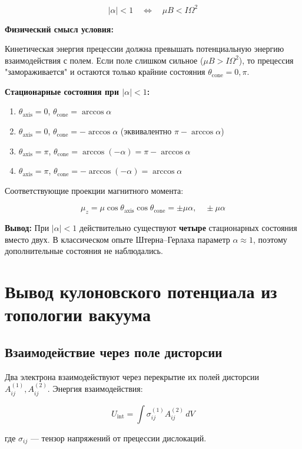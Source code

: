 \documentclass[12pt]{article}
\begin{document}
\[
|\alpha| < 1 \quad \Leftrightarrow \quad \mu B < I \Omega^2
\]

\textbf{Физический смысл условия:}

Кинетическая энергия прецессии должна превышать потенциальную энергию взаимодействия с полем. Если поле слишком сильное ($\mu B > I \Omega^2$), то прецессия "замораживается" и остаются только крайние состояния $\theta_{\text{cone}} = 0, \pi$.

\textbf{Стационарные состояния при $|\alpha| < 1$:}

\begin{enumerate}
\item $\theta_{\text{axis}} = 0$, $\theta_{\text{cone}} = \arccos\alpha$
\item $\theta_{\text{axis}} = 0$, $\theta_{\text{cone}} = -\arccos\alpha$ (эквивалентно $\pi - \arccos\alpha$)
\item $\theta_{\text{axis}} = \pi$, $\theta_{\text{cone}} = \arccos(-\alpha) = \pi - \arccos\alpha$
\item $\theta_{\text{axis}} = \pi$, $\theta_{\text{cone}} = -\arccos(-\alpha) = \arccos\alpha$
\end{enumerate}

Соответствующие проекции магнитного момента:

\[
\mu_z = \mu \cos\theta_{\text{axis}} \cos\theta_{\text{cone}} = \pm \mu \alpha, \quad \pm \mu \alpha
\]

\textbf{Вывод:} При $|\alpha| < 1$ действительно существуют \textbf{четыре} стационарных состояния вместо двух. В классическом опыте Штерна–Герлаха параметр $\alpha \approx 1$, поэтому дополнительные состояния не наблюдались.

\section{Вывод кулоновского потенциала из топологии вакуума}

\subsection{Взаимодействие через поле дисторсии}

Два электрона взаимодействуют через перекрытие их полей дисторсии $A_{ij}^{(1)}, A_{ij}^{(2)}$. Энергия взаимодействия:

\[
U_{\text{int}} = \int \sigma_{ij}^{(1)} A_{ij}^{(2)} \, dV
\]

где $\sigma_{ij}$ — тензор напряжений от прецессии дислокаций.
\end{document}
